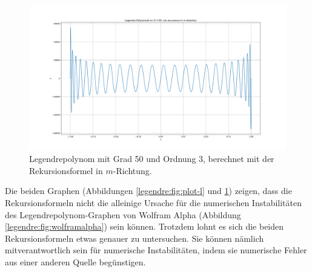 \begin{figure}[!h]
\centering
\includegraphics[width=1.0\linewidth]{papers/legendre/plots/plot_m}
\caption{Legendrepolynom mit Grad 50 und Ordnung 3, berechnet mit der Rekursionsformel in \texorpdfstring{$m$}{m}-Richtung.}
\label{legendre:fig:plot-m}
\end{figure}
Die beiden Graphen (Abbildungen \ref{legendre:fig:plot-l} und \ref{legendre:fig:plot-m}) zeigen, dass die Rekursionsformeln nicht die alleinige Ursache für die numerischen Instabilitäten des Legendrepolynom-Graphen von Wolfram Alpha (Abbildung \ref{legendre:fig:wolframalpha}) sein können.
Trotzdem lohnt es sich die beiden Rekursionsformeln etwas genauer zu untersuchen.
Sie können nämlich mitverantwortlich sein für numerische Instabilitäten, indem sie numerische Fehler aus einer anderen Quelle begünstigen.